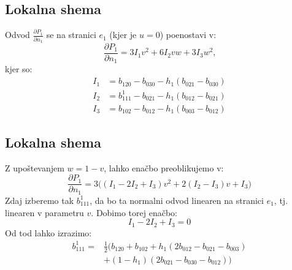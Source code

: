 \documentclass[ignorenonframetext]{beamer}
\let\frametitle\subsection %
\begin{document}
\begin{frame}
\frametitle{Lokalna shema}
Odvod $\frac{\partial{P_1}}{\partial{n_1}}$ se na stranici $e_1$ (kjer je $u=0$) poenostavi v:
$$\frac{\partial{P_1}}{\partial{n_1}} = 3I_1 v^2 + 6 I_2 vw + 3I_3 w^2 \text{,}$$
kjer so:
\[
\begin{split}
	I_1 &= b_{120}-b_{030}-h_1(b_{021}-b_{030})\\
	I_2 &= b_{111}^1-b_{021}-h_1(b_{012}-b_{021})\\
	I_3 &= b_{102}-b_{012}-h_1(b_{003}-b_{012})
\end{split}
\]
\end{frame}

\begin{frame}
\frametitle{Lokalna shema}
Z upoštevanjem $w=1-v$, lahko enačbo preoblikujemo v:
$$\frac{\partial{P_1}}{\partial{n_1}} = 3\bigg((I_1-2I_2+I_3) v^2 + 2 (I_2-I_3) v + I_3 \bigg)$$
Zdaj izberemo tak $b_{111}^1$, da bo ta normalni odvod linearen na stranici $e_1$, tj. linearen v parametru $v$. Dobimo torej enačbo:
$$I_1-2I_2+I_3 = 0$$
Od tod lahko izrazimo:
\[
\begin{split}
b_{111}^1 =& \frac{1}{2}\bigg(b_{120}+b_{102}+h_1(2b_{012}-b_{021}-b_{003})\\
		&+(1-h_1)(2b_{021}-b_{030}-b_{012})\bigg)
\end{split}
\]
\end{frame}
\end{document}
